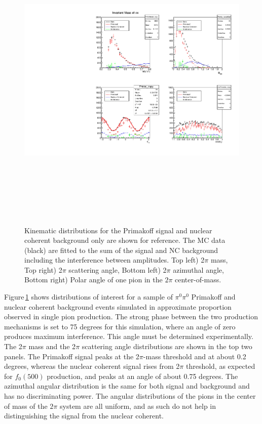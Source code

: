  \begin{figure}[tbp]
\begin{center}
\includegraphics[height=15cm,clip=true]{figures/twopi_primakoff_DSelect_test_File_100000_decomposition_PrimNC.pdf}
\caption{Kinematic distributions for the Primakoff signal and nuclear coherent background only are shown for reference. The MC data (black) are fitted to the sum of the signal and NC background including the interference between amplitudes. 
Top left) 2$\pi$ mass, Top right) 2$\pi$ scattering angle, Bottom left) 2$\pi$ azimuthal angle, 
Bottom right) Polar angle of one pion in the $2\pi$ center-of-mass.
\label{fig:decomposition_PrimNC}}
\end{center} 
\end{figure}

Figure\,\ref{fig:decomposition_PrimNC} shows distributions of interest for a sample of $\pi^0\pi^0$ Primakoff and
nuclear coherent background events simulated in approximate proportion observed in single pion production. The strong phase between the two production mechanisms is set to
75 degrees for this simulation, where an angle of zero produces maximum interference. This angle must be determined experimentally. 
The 2$\pi$ mass and the 2$\pi$ scattering angle distributions are shown in the top two panels. The Primakoff signal peaks at the 2$\pi$-mass threshold and at about 0.2 degrees, whereas the nuclear coherent signal rises from 2$\pi$ threshold, as expected for $f_0(500)$ production, and peaks at an angle of about 0.75 degrees. The azimuthal angular distribution is the same for both signal and background and has no discriminating power. The angular distributions of the pions in
the center of mass of the $2\pi$ system are all uniform, and as such do not help in distinguishing the signal from the nuclear coherent.  

